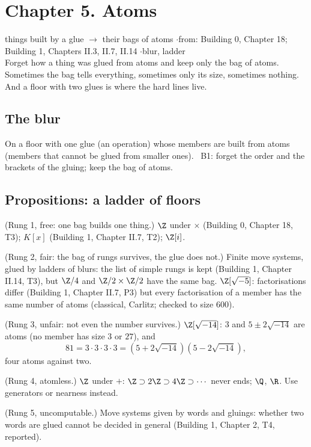 \section*{Chapter 5. Atoms}
\begin{center}
{\normalsize things built by a glue $\to$ their bags of atoms \quad$\cdot$\quad from: Building 0, Chapter 18; Building 1, Chapters II.3, II.7, II.14 \quad$\cdot$\quad blur, ladder}\\[4pt]
{\small Forget how a thing was glued from atoms and keep only the bag of atoms. Sometimes the bag tells everything, sometimes only its size, sometimes nothing. And a floor with two glues is where the hard lines live.}
\end{center}

\subsection*{The blur}

On a floor with one glue (an operation) whose members are built from atoms (members that cannot be glued from smaller ones). \ B1: forget the order and the brackets of the gluing; keep the bag of atoms.

\subsection*{Propositions: a ladder of floors}

\begin{lines}
\item[\lab{P1}] (Rung 1, free: one bag builds one thing.) $\Z$ under $\times$ (Building 0, Chapter 18, T3); $K[x]$ (Building 1, Chapter II.7, T2); $\Z[i]$.
\item[\lab{P2}] (Rung 2, fair: the bag of rungs survives, the glue does not.) Finite move systems, glued by ladders of blurs: the list of simple rungs is kept (Building 1, Chapter II.14, T3), but $\Z/4$ and $\Z/2 \times \Z/2$ have the same bag. $\Z[\sqrt{-5}]$: factorisations differ (Building 1, Chapter II.7, P3) but every factorisation of a member has the same number of atoms (classical, Carlitz; checked to size $600$).
\item[\lab{P3}] (Rung 3, unfair: not even the number survives.) $\Z[\sqrt{-14}]$: $3$ and $5 \pm 2\sqrt{-14}$ are atoms (no member has size $3$ or $27$), and \[ 81 = 3 \cdot 3 \cdot 3 \cdot 3 = (5 + 2\sqrt{-14})(5 - 2\sqrt{-14}) , \] four atoms against two.
\item[\lab{P4}] (Rung 4, atomless.) $\Z$ under $+$: $\Z \supset 2\Z \supset 4\Z \supset \cdots$ never ends; $\Q$, $\R$. Use generators or nearness instead.
\item[\lab{P5}] (Rung 5, uncomputable.) Move systems given by words and gluings: whether two words are glued cannot be decided in general (Building 1, Chapter 2, T4, reported).
\end{lines}

